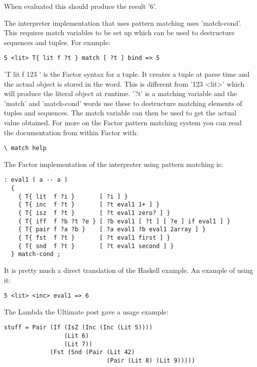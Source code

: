 When evaluated this should produce the result '6'.

The interpreter implementation that uses pattern matching uses
'match-cond'. This requires match variables to be set up which can be
used to destructure sequences and tuples. For example:

\begin{verbatim}
5 <lit> T{ lit f ?t } match [ ?t ] bind => 5
\end{verbatim}

'T{ lit f 123 }' is the Factor syntax for a tuple. It creates a tuple
at parse time and the actual object is stored in the word. This is
different from '123 <lit>' which will produce the literal object at
runtime. '?t' is a matching variable and the 'match' and 'match-cond'
words use these to destructure matching elements of tuples and
sequences. The match variable can then be used to get the actual value
obtained. For more on the Factor pattern matching system you can read
the documentation from within Factor with:

\begin{verbatim}
\ match help
\end{verbatim}

The Factor implementation of the interpreter using pattern matching
is:

\begin{verbatim}
: eval1 ( a -- a )
  {
    { T{ lit  f ?i }       [ ?i ] }
    { T{ inc  f ?t }       [ ?t eval1 1+ ] }
    { T{ isz  f ?t }       [ ?t eval1 zero? ] }
    { T{ iff  f ?b ?t ?e } [ ?b eval1 [ ?t ] [ ?e ] if eval1 ] }
    { T{ pair f ?a ?b }    [ ?a eval1 ?b eval1 2array ] }
    { T{ fst  f ?t }       [ ?t eval1 first ] }
    { T{ snd  f ?t }       [ ?t eval1 second ] }
  } match-cond ; 
\end{verbatim}

It is pretty much a direct translation of the Haskell example. An
example of using it:

\begin{verbatim}
5 <lit> <inc> eval1 => 6
\end{verbatim}

The Lambda the Ultimate post gave a usage example:

\begin{verbatim}
stuff = Pair (If (IsZ (Inc (Inc (Lit 5))))
                 (Lit 6)
                 (Lit 7))
             (Fst (Snd (Pair (Lit 42)
                             (Pair (Lit 8) (Lit 9)))))
\end{verbatim}


